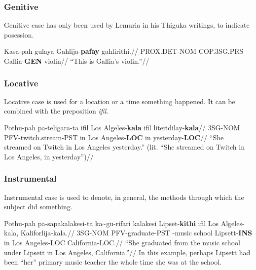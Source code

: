 \subsubsection{Genitive}
Genitive case has only been used by Lemuria in his Thiguka writings, to indicate posession.

\ex
\begingl
\gla  Kasa-pah     gulaya     Gahlija-\textbf{pafay} gahlirithi.//
\glb  PROX.DET-NOM COP.3SG.PRS Gallia-\textbf{GEN}   violin//
\glft ``This is Gallia's violin.''//
\endgl
\xe

\newpage

\subsubsection{Locative}
Locative case is used for a location or a time something happened.
It can be combined with the preposition \textit{ifil}.

\ex
\begingl
\gla  Pothu-pah pa-teligara-ta        ifil Los Algeles-\textbf{kala} ifil literidilay-\textbf{kala}//
\glb  3SG-NOM   PFV-twitch.stream-PST in   Los Angeles-\textbf{LOC}  in   yesterday-\textbf{LOC}//
\glft ``She streamed on Twitch in Los Angeles yesterday.'' (lit. ``She streamed on Twitch in Los Angeles, in yesterday'')//
\endgl
\xe

\subsubsection{Instrumental}
Instrumental case is used to denote, in general, the methods through which the subject did something.

\ex
\begingl
\gla  Pothu-pah pa-sapakalakesi-ta ka\~{}gu-rifari  kalakesi Lipset-\textbf{kithi} ifil Los Algeles-kala, Kaliforlija-kala.//
\glb  3SG-NOM   PFV-graduate-PST   \agradj{}-music  school   Lipsett-\textbf{INS}  in   Los Angeles-LOC   California-LOC.//
\glft ``She graduated from the music school under Lipsett in Los Angeles, California.''//
\endgl
\xe
In this example, perhaps Lipsett had been ``her'' primary music teacher the whole time she was at the school.

\newpage{}
